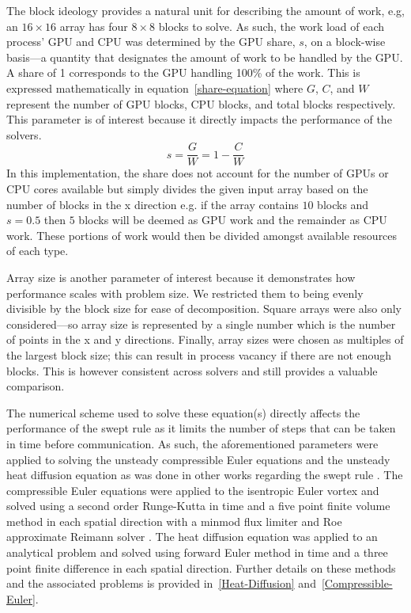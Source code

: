 \documentclass[review]{elsarticle}
\begin{document}
\par
The block ideology provides a natural unit for describing the amount of work, e.g, an $16\times16$ array has four $8\times8$ blocks to solve. As such, the work load of each process' GPU and CPU was determined by the GPU share, $s$, on a block-wise basis---a quantity that designates the amount of work to be handled by the GPU. A share of 1 corresponds to the GPU handling 100\% of the work. This is expressed mathematically in equation~\ref{share-equation} where $G$, $C$, and $W$ represent the number of GPU blocks, CPU blocks, and total blocks respectively. This parameter is of interest because it directly impacts the performance of the solvers.
\begin{equation}
    \label{share-equation}
    s = \frac{G}{W} = 1-\frac{C}{W}
\end{equation}
In this implementation, the share does not account for the number of GPUs or CPU cores available but simply divides the given input array based on the number of blocks in the x direction e.g. if the array contains $10$ blocks and $s=0.5$ then $5$ blocks will be deemed as GPU work and the remainder as CPU work. These portions of work would then be divided amongst available resources of each type. 

\par
Array size is another parameter of interest because it demonstrates how performance scales with problem size. We restricted them to being evenly divisible by the block size for ease of decomposition. Square arrays were also only considered---so array size is represented by a single number which is the number of points in the x and y directions. Finally, array sizes were chosen as multiples of the largest block size; this can result in process vacancy if there are not enough blocks. This is however consistent across solvers and still provides a valuable comparison.

\par
The numerical scheme used to solve these equation(s) directly affects the performance of the swept rule as it limits the number of steps that can be taken in time before communication.
As such, the aforementioned parameters were applied to solving the unsteady compressible Euler equations and the unsteady heat diffusion equation as was done in other works regarding the swept rule \cite{Magee2018AcceleratingDecomposition,Alhubail2016ThePDEs,Alhubail2018ThePDEs, Magee2020ApplyingSystems}. The compressible Euler equations were applied to the isentropic Euler vortex and solved using a second order Runge-Kutta in time and a five point finite volume method in each spatial direction with a minmod flux limiter and Roe approximate Reimann solver \cite{SpiegelAMethods,Leveque2002FiniteProblems}. The heat diffusion equation was applied to an analytical problem and solved using forward Euler method in time and a three point finite difference in each spatial direction. Further details on these methods and the associated problems is provided in~\ref{Heat-Diffusion} and~\ref{Compressible-Euler}.
\end{document}
